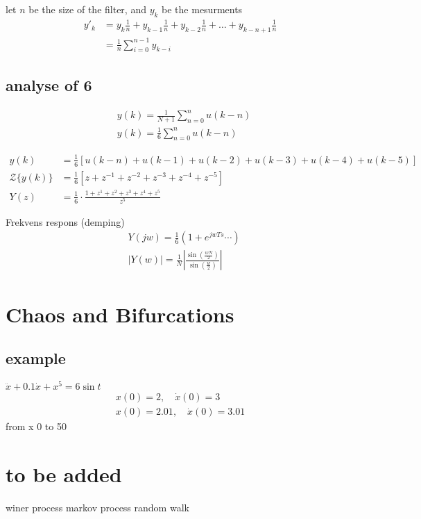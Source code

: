 \documentclass[a4paper,12pt]{article}
\begin{document}
let $n$ be the size of the filter, and $y_k$ be the mesurments
\begin{align*} 
y'_k &=y_{k}\frac{1}{n}+y_{k-1}\frac{1}{n}+y_{k-2}\frac{1}{n}+\dots+y_{k-n+1}\frac{1}{n}\\
     &=\frac{1}{n}\sum_{i=0}^{n-1}y_{k-i} 
\end{align*}


\subsection{analyse of 6}
\label{sec-5-1}
\begin{equation}
\begin{aligned}
&y(k)=\frac{1}{N+1} \sum_{n=0}^{n} u(k-n)\\
&y(k)=\frac{1}{6} \sum_{n=0}^{n} u(k-n)
\end{aligned}
\end{equation}

\begin{equation}
\begin{aligned}
y(k) &=\frac{1}{6}[u(k-n)+u(k-1)+u(k-2)+u(k-3)+u(k-4)+u(k-5)] \\
\mathcal{Z}\{y(k)\} &=\frac{1}{6}\left[z+z^{-1}+z^{-2}+z^{-3}+z^{-4}+z^{-5}\right] \\
Y(z) &=\frac{1}{6} \cdot \frac{1+z^{1}+z^{2}+z^{3}+z^{4}+z^{5}}{z^{5}}
\end{aligned}
\end{equation}


Frekvens respons (demping)
\begin{equation}
\begin{aligned}
&Y(j w)=\frac{1}{6}\left(1+e^{j w T s} \cdots\right)\\
&|Y(w)|=\frac{1}{N}\left|\frac{\sin \left(\frac{w N}{2}\right)}{\sin \left(\frac{w}{2}\right)}\right|
\end{aligned}
\end{equation}


\section{Chaos and Bifurcations}
\label{sec-6}
\subsection{example}
\label{sec-6-1}
$\ddot{x}+0.1 \dot{x}+x^{5}=6 \sin t$
\begin{equation}
\begin{array}{l}{x(0)=2, \quad \dot x(0)=3} \\
 {x(0)=2.01, \quad \dot{x}(0)=3.01}\end{array}
\end{equation}
from x 0 to 50 


\section{to be added}
\label{sec-7}
winer process 
markov process
random walk
\end{document}
